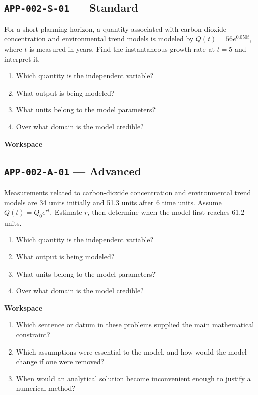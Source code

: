 \documentclass[11pt]{book}
\newcommand{\pid}[1]{\texttt{#1}}
\newcommand{\workspace}{\par\vspace{0.7in}\hrulefill\par\vspace{0.55in}\hrulefill\par}
\begin{document}
\subsection*{\pid{APP-002-S-01} — Standard}
\begin{problembox}
For a short planning horizon, a quantity associated with carbon-dioxide concentration and environmental trend models is modeled by $Q(t)=56e^{0.050t}$, where $t$ is measured in years. Find the instantaneous growth rate at $t=5$ and interpret it.
\end{problembox}
\begin{promptbox}\begin{enumerate}
\item Which quantity is the independent variable?
\item What output is being modeled?
\item What units belong to the model parameters?
\item Over what domain is the model credible?
\end{enumerate}\end{promptbox}
\textbf{Workspace}\workspace
{}
\subsection*{\pid{APP-002-A-01} — Advanced}
\begin{problembox}
Measurements related to carbon-dioxide concentration and environmental trend models are 34 units initially and 51.3 units after 6 time units. Assume $Q(t)=Q_0e^{rt}$. Estimate $r$, then determine when the model first reaches 61.2 units.
\end{problembox}
\begin{promptbox}\begin{enumerate}
\item Which quantity is the independent variable?
\item What output is being modeled?
\item What units belong to the model parameters?
\item Over what domain is the model credible?
\end{enumerate}\end{promptbox}
\textbf{Workspace}\workspace
\begin{reflectionbox}\begin{enumerate}
\item Which sentence or datum in these problems supplied the main mathematical constraint?
\item Which assumptions were essential to the model, and how would the model change if one were removed?
\item When would an analytical solution become inconvenient enough to justify a numerical method?
\end{enumerate}\end{reflectionbox}
\end{document}
